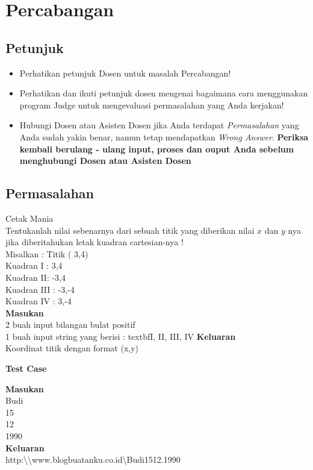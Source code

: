\chapter{Percabangan}

\section{Petunjuk}
\begin{itemize}
	\item Perhatikan petunjuk Dosen untuk masalah Percabangan!
	\
	\item Perhatikan dan ikuti petunjuk dosen mengenai bagaimana cara menggunakan program Judge untuk mengevaluasi permasalahan yang Anda kerjakan!
	
		\item Hubungi Dosen atau Asisten Dosen jika Anda terdapat \textit{Permasalahan} yang Anda sudah yakin benar, namun tetap mendapatkan \textit{Wrong Answer}. \textbf{Periksa kembali berulang - ulang input, proses dan ouput Anda sebelum menghubungi Dosen atau Asisten Dosen}
\end{itemize}

\newpage
\section{Permasalahan}
\begin{permasalahan}{Cetak Mania}\\
\label{prob:CetakMania}
Tentukanlah nilai sebenarnya dari sebuah titik yang diberikan nilai $x$ dan $y$ nya jika diberitahukan letak kuadran cartesian-nya ! \\
Misalkan : Titik ( 3,4) \\
Kuadran I : 3,4 \\
Kuadran II: -3,4 \\
Kuadran III : -3,-4 \\
Kuadran IV : 3,-4 \\
	\textbf{Masukan}\\
	2 buah input bilangan bulat positif \\
	1 buah input string yang berisi : textbf{I, II, III, IV}
	\textbf{Keluaran}\\
	Koordinat titik dengan format (x,y) \\
	\begin{center}
	\textbf{Test Case}\\
	\end{center}
	\textbf{Masukan}\\
	Budi \\
	15 \\
	12 \\
	1990 \\
	\textbf{Keluaran}\\
	http:\textbackslash\textbackslash www.blogbuatanku.co.id\textbackslash Budi1512.1990 \\	
\end{permasalahan}




